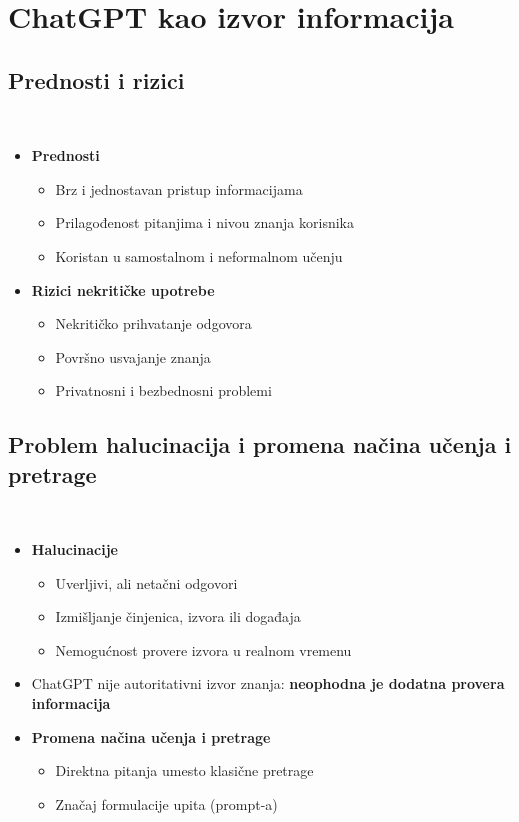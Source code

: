\documentclass{beamer}
\newcommand{\frametitlesection}{
    \raggedright
    \insertsubsectionhead\\[-2pt]
    {\small \insertsectionhead}
}
\begin{document}
\section{ChatGPT kao izvor informacija}
\subsection{Prednosti i rizici}

\begin{frame}{\frametitlesection}

\begin{itemize}
    \item \textbf{Prednosti}
    \begin{itemize}
        \item Brz i jednostavan pristup informacijama
        \item Prilagođenost pitanjima i nivou znanja korisnika
        \item Koristan u samostalnom i neformalnom učenju
    \end{itemize}
    \item \textbf{Rizici nekritičke upotrebe}
    \begin{itemize}
        \item Nekritičko prihvatanje odgovora
        \item Površno usvajanje znanja
        \item Privatnosni i bezbednosni problemi
    \end{itemize}
\end{itemize}

\end{frame}


\subsection{Problem halucinacija i promena načina učenja i pretrage}

\begin{frame}{\frametitlesection}

\begin{itemize}
    \item \textbf{Halucinacije}
    \begin{itemize}
        \item Uverljivi, ali netačni odgovori
        \item Izmišljanje činjenica, izvora ili događaja
        \item Nemogućnost provere izvora u realnom vremenu
    \end{itemize}

    \item ChatGPT nije autoritativni izvor znanja: \textbf{neophodna je dodatna provera informacija}
    \item \textbf{Promena načina učenja i pretrage}
    \begin{itemize}
        \item Direktna pitanja umesto klasične pretrage
        \item Značaj formulacije upita (prompt-a)
    \end{itemize}
\end{itemize}
\end{frame}
\end{document}
